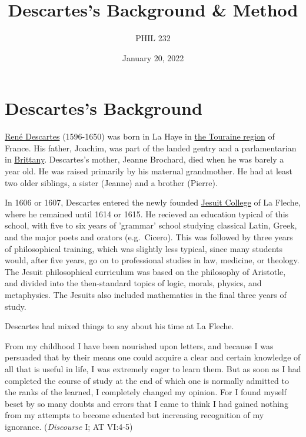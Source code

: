 \documentclass[12pt]{article}
\author{PHIL 232}
\date{January 20, 2022}
\title{Descartes's Background \& Method}
\begin{document}
\maketitle
\tableofcontents

\setcounter{tocdepth}{6}
\tableofcontents


\section{Descartes's Background}
\label{sec:org59472d4}
\href{http://plato.stanford.edu/entries/descartes/}{René Descartes} (1596-1650) was born in La Haye in \href{http://en.wikipedia.org/wiki/Touraine}{the Touraine region} of France. His
father, Joachim, was part of the landed gentry and a parlamentarian in \href{http://en.wikipedia.org/wiki/Brittany}{Brittany}.
Descartes's mother, Jeanne Brochard, died when he was barely a year old. He was
raised primarily by his maternal grandmother. He had at least two older siblings, a
sister (Jeanne) and a brother (Pierre).

In 1606 or 1607, Descartes entered the newly founded \href{http://en.wikipedia.org/wiki/Jesuit}{Jesuit College} of La Fleche,
where he remained until 1614 or 1615. He recieved an education typical of this
school, with five to six years of 'grammar' school studying classical Latin, Greek,
and the major poets and orators (e.g. Cicero). This was followed by three years of
philosophical training, which was slightly less typical, since many students would,
after five years, go on to professional studies in law, medicine, or theology. The
Jesuit philosophical curriculum was based on the philosophy of Aristotle, and divided
into the then-standard topics of logic, morals, physics, and metaphysics. The Jesuits
also included mathematics in the final three years of study.

Descartes had mixed things to say about his time at La Fleche.

\begin{quote-b}
From my childhood I have been nourished upon letters, and because I was persuaded
that by their means one could acquire a clear and certain knowledge of all that is
useful in life, I was extremely eager to learn them. But as soon as I had completed
the course of study at the end of which one is normally admitted to the ranks of
the learned, I completely changed my opinion. For I found myself beset by so many
doubts and errors that I came to think I had gained nothing from my attempts to
become educated but increasing recognition of my ignorance. (\emph{Discourse} I; AT
VI:4-5)
\end{quote-b}
\end{document}
